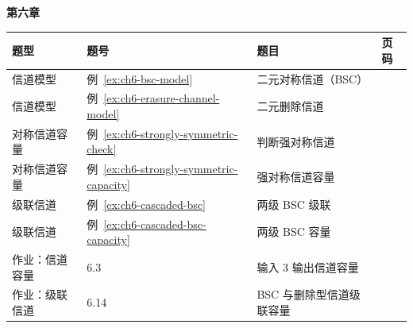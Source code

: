{\noindent\textbf{第六章}\par
\begin{tabularx}{\textwidth}{@{}p{}p{}>{\raggedright\arraybackslash}X>{\raggedleft\arraybackslash}p{}@{}}
\toprule
\textbf{题型} & \textbf{题号} & \textbf{题目} & \textbf{页码} \\
\midrule
信道模型 & 例~\ref{ex:ch6-bsc-model} & 二元对称信道（BSC） & \hyperref[ex:ch6-bsc-model]{\pageref*{ex:ch6-bsc-model}}  \\
信道模型 & 例~\ref{ex:ch6-erasure-channel-model} & 二元删除信道 & \hyperref[ex:ch6-erasure-channel-model]{\pageref*{ex:ch6-erasure-channel-model}}  \\
对称信道容量 & 例~\ref{ex:ch6-strongly-symmetric-check} & 判断强对称信道 & \hyperref[ex:ch6-strongly-symmetric-check]{\pageref*{ex:ch6-strongly-symmetric-check}}  \\
对称信道容量 & 例~\ref{ex:ch6-strongly-symmetric-capacity} & 强对称信道容量 & \hyperref[ex:ch6-strongly-symmetric-capacity]{\pageref*{ex:ch6-strongly-symmetric-capacity}}  \\
级联信道 & 例~\ref{ex:ch6-cascaded-bsc} & 两级 BSC 级联 & \hyperref[ex:ch6-cascaded-bsc]{\pageref*{ex:ch6-cascaded-bsc}}  \\
级联信道 & 例~\ref{ex:ch6-cascaded-bsc-capacity} & 两级 BSC 容量 & \hyperref[ex:ch6-cascaded-bsc-capacity]{\pageref*{ex:ch6-cascaded-bsc-capacity}}  \\
作业：信道容量 & 6.3 & 2 输入 3 输出信道容量 & \hyperref[hw:ch6-3-channel-capacity]{\pageref*{hw:ch6-3-channel-capacity}}  \\
作业：级联信道 & 6.14 & BSC 与删除型信道级联容量 & \hyperref[hw:ch6-14-cascaded-bsc-erasure-capacity]{\pageref*{hw:ch6-14-cascaded-bsc-erasure-capacity}}  \\
\bottomrule
\end{tabularx}

}
